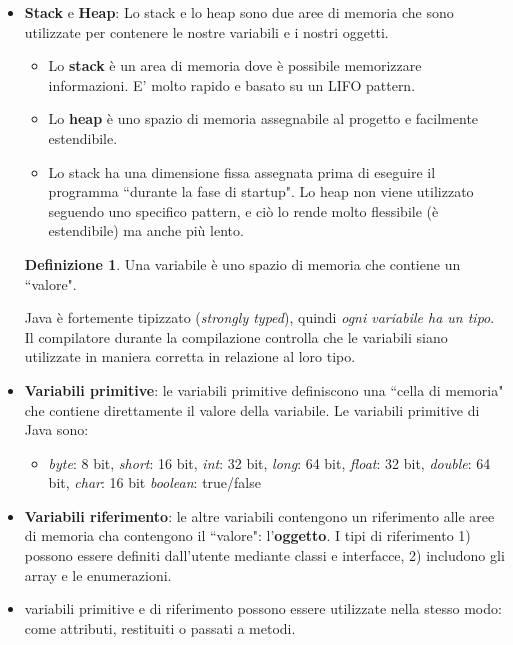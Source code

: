 \documentclass{article}
\theoremstyle{definition}
\newtheorem{mydef}{Definizione}
\begin{document}
\begin{itemize}
\item \textbf{Stack} e \textbf{Heap}:  Lo stack e lo heap sono due aree di memoria che sono utilizzate per contenere le nostre variabili e i nostri oggetti.
\begin{itemize}
\item Lo \textbf{stack} \`e un area di memoria dove \`e possibile memorizzare informazioni. E' molto rapido e basato su un LIFO pattern.
\item Lo \textbf{heap} \`e uno spazio di memoria assegnabile al progetto e facilmente 
estendibile. 
\item Lo stack ha una dimensione fissa assegnata prima di eseguire il programma ``durante la fase di startup". Lo heap non viene utilizzato seguendo uno specifico pattern, e ci\`o lo rende molto flessibile (\`e estendibile) ma anche pi\`u lento. 
\end{itemize}


\begin{mydef} Una variabile \`e uno spazio di memoria che contiene un ``valore". 
\end{mydef}
Java \`e fortemente tipizzato (\emph{strongly typed}), quindi \emph{ogni variabile ha un tipo}. Il compilatore durante la compilazione controlla che le variabili siano utilizzate in maniera corretta in relazione al loro tipo.\\

\item \textbf{Variabili primitive}: le variabili primitive definiscono una ``cella di memoria" che contiene direttamente il valore della variabile. Le variabili primitive di Java sono:
\begin{itemize}
\item \emph{byte}: 8 bit, \emph{short}: 16 bit, \emph{int}: 32 bit, \emph{long}: 64 bit, \emph{float}: 32 bit, \emph{double}: 64 bit, \emph{char}: 16 bit \emph{boolean}: true/false
\end{itemize}
\item \textbf{Variabili riferimento}: le altre variabili contengono un riferimento alle aree di memoria cha contengono il ``valore": l'\textbf{oggetto}. I tipi di riferimento 1) possono essere definiti dall'utente mediante classi e interfacce, 2) includono gli array e le enumerazioni.
\item variabili primitive e di riferimento possono essere utilizzate nella stesso modo: come attributi, restituiti o passati a metodi.
\end{itemize}
\end{document}
